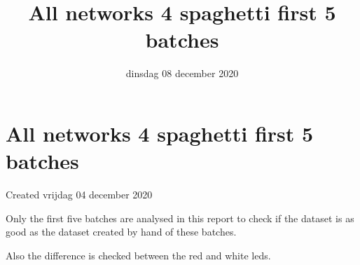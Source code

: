 \documentclass{scrartcl}
\title{All networks 4 spaghetti first 5 batches}
\date{dinsdag 08 december 2020}
\author{}
\begin{document}
\maketitle

		\section{All networks 4 spaghetti first 5 batches}

Created vrijdag 04 december 2020



Only the first five batches are analysed in this report to check if the dataset is as good as the dataset created by hand of these batches.

Also the difference is checked between the red and white leds.
\end{document}
